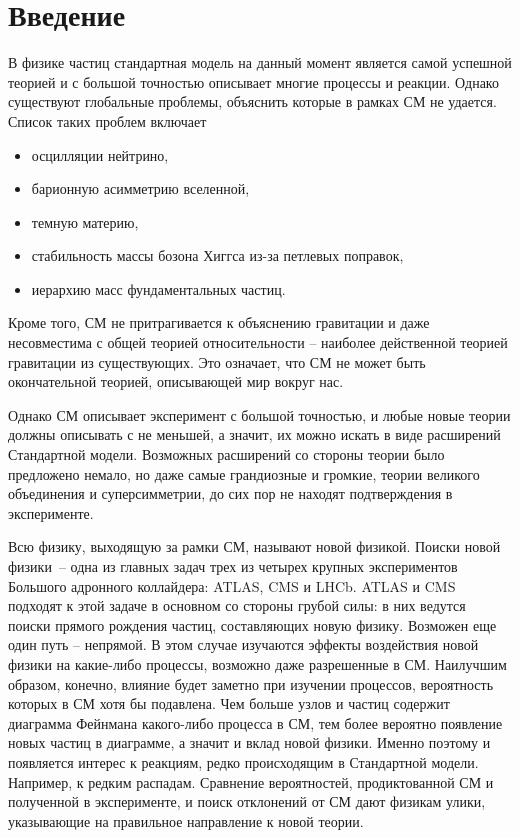 \documentclass[a4paper, 10pt, twocolumn]{article}
\begin{document}

\section{Введение}

В физике частиц стандартная модель на данный момент является самой 
успешной теорией и с большой точностью описывает многие процессы 
и реакции. Однако существуют глобальные проблемы, объяснить которые 
в рамках СМ не удается. Список таких проблем включает
\begin{itemize}
	\item осцилляции нейтрино,
	\item барионную асимметрию вселенной,
	\item темную материю,
	\item стабильность массы бозона Хиггса из-за петлевых поправок,
	\item иерархию масс фундаментальных частиц.
\end{itemize}
Кроме того, СМ не притрагивается к объяснению гравитации и даже 
несовместима с общей теорией относительности -- наиболее действенной 
теорией гравитации из существующих. Это означает, что СМ не может быть 
окончательной теорией, описывающей мир вокруг нас.

Однако СМ описывает эксперимент с большой точностью, и любые новые 
теории должны описывать с не меньшей, а значит, их можно искать в виде 
расширений Стандартной модели. Возможных расширений со стороны теории 
было предложено немало, но даже самые грандиозные и громкие, теории 
великого объединения и суперсимметрии, до сих пор не находят 
подтверждения в эксперименте.

Всю физику, выходящую за рамки СМ, называют новой физикой. Поиски новой 
физики~-- одна из главных задач трех из четырех крупных экспериментов 
Большого адронного коллайдера: ATLAS, CMS и LHCb. ATLAS и CMS подходят 
к этой задаче в основном со стороны грубой силы: в них ведутся поиски 
прямого рождения частиц, составляющих новую физику. Возможен еще один 
путь -- непрямой. В этом случае изучаются эффекты воздействия новой 
физики на какие-либо процессы, возможно даже разрешенные в СМ. 
Наилучшим образом, конечно, влияние будет заметно при изучении 
процессов, вероятность которых в СМ хотя бы подавлена. Чем больше узлов 
и частиц содержит диаграмма Фейнмана какого-либо процесса в СМ, тем 
более вероятно появление новых частиц в диаграмме, а значит и вклад 
новой физики. Именно поэтому и появляется интерес к реакциям, редко 
происходящим в Стандартной модели. Например, к редким распадам. 
Сравнение вероятностей, продиктованной СМ и полученной в эксперименте, 
и поиск отклонений от СМ дают физикам улики, указывающие на правильное 
направление к новой теории.
\end{document}
